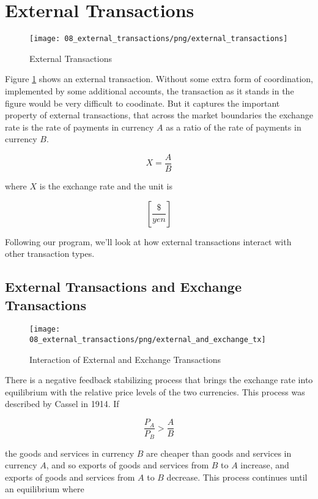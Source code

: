 \section{External Transactions}
\label{section:external_transactions}

\begin{figure}[H]
\centering
\texttt{[image: 08\_external\_transactions/png/external\_transactions]}
\caption{External Transactions}
\label{fig:external_transactions}
\end{figure}

Figure \ref{fig:external_transactions} shows an external transaction. Without some extra form of
coordination, implemented by some additional accounts, the transaction as it stands in the figure
would be very difficult to coodinate. But it captures the important property of external
transactions, that across the market boundaries the exchange rate is the rate of payments in
currency $A$ as a ratio of the rate of payments in currency $B$.

\[
    X = \frac A  B
\]


where $X$ is the exchange rate and the unit is

\[
    \left[ \frac {\$} {yen} \right]
\]

Following our program, we'll look at how external transactions interact with other transaction
types.

\subsection{External Transactions and Exchange Transactions}

\begin{figure}[H]
\centering
\texttt{[image: 08\_external\_transactions/png/external\_and\_exchange\_tx]}
\caption{Interaction of External and Exchange Transactions}
\label{fig:external_and_exchange_tx}
\end{figure}

There is a negative feedback stabilizing process that brings the exchange rate into equilibrium with
the relative price levels of the two currencies. This process was described by Cassel
\cite{cassel1914} in 1914. If   

\[
    \frac {P_A} {P_B} > \frac A B
\]

the goods and services in currency $B$ are cheaper than goods and services in currency $A$, and so
exports of goods and services from $B$ to $A$ increase, and exports of goods and services from $A$
to $B$ decrease. This process continues until an equilibrium where

